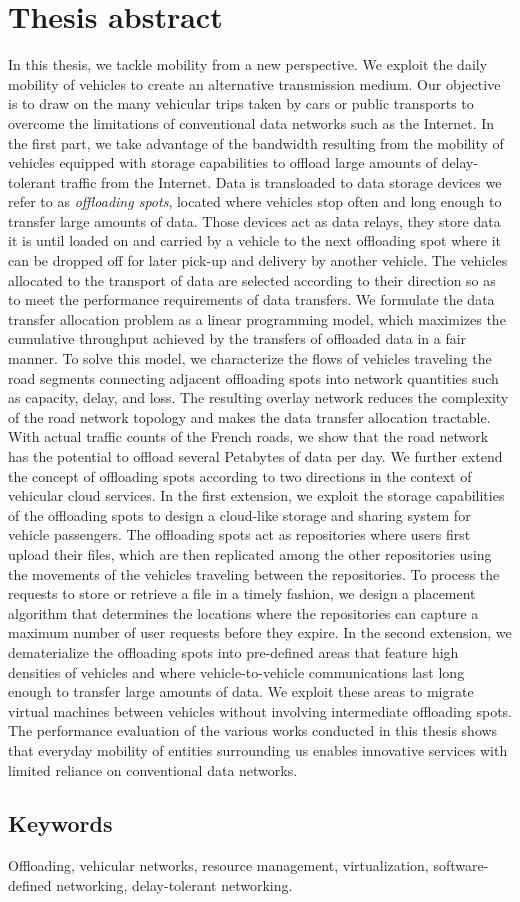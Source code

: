 \chapter*{Thesis abstract}
\vspace{-10pt}
In this thesis, we tackle mobility from a new perspective. We exploit the daily mobility of vehicles to create an alternative transmission medium. Our objective is to draw on the many vehicular trips taken by cars or public transports to overcome the limitations of conventional data networks such as the Internet. In the first part, we take advantage of the bandwidth resulting from the mobility of vehicles equipped with storage capabilities to offload large amounts of delay-tolerant traffic from the Internet. Data is transloaded to data storage devices we refer to as \textit{offloading spots}, located where vehicles stop often and long enough to transfer large amounts of data. Those devices act as data relays, \ie they store data it is until loaded on and carried by a vehicle to the next offloading spot where it can be dropped off for later pick-up and delivery by another vehicle. The vehicles allocated to the transport of data are selected according to their direction so as to meet the performance requirements of data transfers. We formulate the data transfer allocation problem as a linear programming model, which maximizes the cumulative throughput achieved by the transfers of offloaded data in a fair manner. To solve this model, we characterize the flows of vehicles traveling the road segments connecting adjacent offloading spots into network quantities such as capacity, delay, and loss. The resulting overlay network reduces the complexity of the road network topology and makes the data transfer allocation tractable. With actual traffic counts of the French roads, we show that the road network has the potential to offload several Petabytes of data per day. We further extend the concept of offloading spots according to two directions in the context of vehicular cloud services. In the first extension, we exploit the storage capabilities of the offloading spots to design a cloud-like storage and sharing system for vehicle passengers. The offloading spots act as repositories where users first upload their files, which are then replicated among the other repositories using the movements of the vehicles traveling between the repositories. To process the requests to store or retrieve a file in a timely fashion, we design a placement algorithm that determines the locations where the repositories can capture a maximum number of user requests before they expire. In the second extension, we dematerialize the offloading spots into pre-defined areas that feature high densities of vehicles and where vehicle-to-vehicle communications last long enough to transfer large amounts of data. We exploit these areas to migrate virtual machines between vehicles without involving intermediate offloading spots. The performance evaluation of the various works conducted in this thesis shows that everyday mobility of entities surrounding us enables innovative services with limited reliance on conventional data networks.        


\section*{Keywords}

Offloading, vehicular networks, resource management, virtualization, software-defined networking, delay-tolerant networking.
